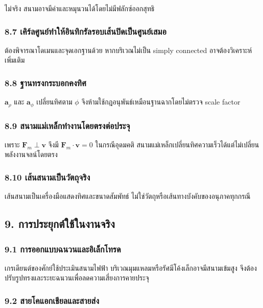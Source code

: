 ไม่จริง สนามอาจมีค่าและหมุนวนได้โดยไม่มีฟลักซ์ออกสุทธิ

\subsubsection{8.7 เคิร์ลศูนย์ทำให้อินทิกรัลรอบเส้นปิดเป็นศูนย์เสมอ}

ต้องพิจารณาโดเมนและจุดเอกฐานด้วย หากบริเวณไม่เป็น simply connected อาจต้องวิเคราะห์เพิ่มเติม

\subsubsection{8.8 ฐานทรงกระบอกคงทิศ}

\(\mathbf{a}_\rho\) และ \(\mathbf{a}_\phi\) เปลี่ยนทิศตาม \(\phi\) จึงห้ามใช้กฎอนุพันธ์เหมือนฐานฉากโดยไม่ตรวจ scale factor

\subsubsection{8.9 สนามแม่เหล็กทำงานโดยตรงต่อประจุ}

เพราะ \(\mathbf{F}_m\perp\mathbf{v}\) จึงมี \(\mathbf{F}_m\cdot\mathbf{v}=0\) ในกรณีอุดมคติ สนามแม่เหล็กเปลี่ยนทิศความเร็วได้แต่ไม่เปลี่ยนพลังงานจลน์โดยตรง

\subsubsection{8.10 เส้นสนามเป็นวัตถุจริง}

เส้นสนามเป็นเครื่องมือแสดงทิศและขนาดสัมพัทธ์ ไม่ใช่วัตถุหรือเส้นทางบังคับของอนุภาคทุกกรณี

\subsection{9. การประยุกต์ใช้ในงานจริง}

\subsubsection{9.1 การออกแบบฉนวนและอิเล็กโทรด}

เกรเดียนต์ของศักย์ใช้ประเมินสนามไฟฟ้า บริเวณมุมแหลมหรือรัศมีโค้งเล็กอาจมีสนามเข้มสูง จึงต้องปรับรูปทรงและระยะฉนวนเพื่อลดความเสี่ยงการคายประจุ

\subsubsection{9.2 สายโคแอกเชียลและสายส่ง}

